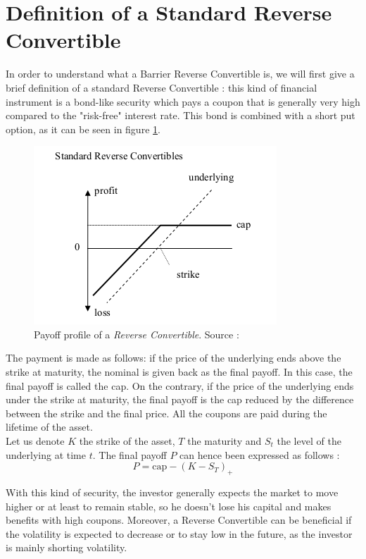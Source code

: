 \documentclass[a4paper,11pt,english]{book}
\begin{document}
\section{Definition of a Standard Reverse Convertible}
In order to understand what a Barrier Reverse Convertible is, we will first give a brief definition of a standard Reverse Convertible : this kind of financial instrument is a bond-like security which pays a coupon that is generally very high compared to the "risk-free" interest rate. This bond is combined with a short put option, as it can be seen in figure \ref{fig:RC-payoff}.

\begin{figure}[!h]
    \centering
    \includegraphics[scale=0.7]{images/RC.png}
    \caption{Payoff profile of a \textit{Reverse Convertible}. Source : \cite{lindauer2008pricing}}
    \label{fig:RC-payoff}
\end{figure}

The payment is made as follows: if the price of the underlying ends above the strike at maturity, the nominal is given back as the final payoff. In this case, the final payoff is called the cap. On the contrary, if the price of the underlying ends under the strike at maturity, the final payoff is the cap reduced by the difference between the strike and the final price. All the coupons are paid during the lifetime of the asset.\\

Let us denote $K$ the strike of the asset, $T$ the maturity and $S_{t}$ the level of the underlying at time $t$. The final payoff $P$ can hence been expressed as follows :
$$P=\text{cap}-(K-S_{T})_{+}$$

With this kind of security, the investor generally expects the market to move higher or at least to remain stable, so he doesn't lose his capital and makes benefits with high coupons. Moreover, a Reverse Convertible can be beneficial if the volatility is expected to decrease or to stay low in the future, as the investor is mainly shorting volatility.
\end{document}
